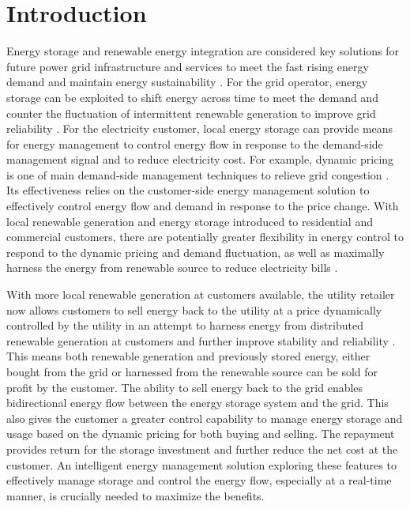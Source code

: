 \documentclass[journal]{IEEEtran}
\begin{document}
\section{Introduction} \label{sec:Introduction}

Energy storage and renewable energy integration are considered key solutions for  future power grid infrastructure and services to meet the fast rising energy demand and maintain energy sustainability \cite{dek10,CastilloGayme:Elsevier14}. For the grid operator, energy storage  can be exploited to shift energy across time to meet the demand and counter the fluctuation of intermittent renewable generation to improve grid reliability \cite{CastilloGayme:Elsevier14,SuGamal:TPS13,SunDongLiang:JSTSP14,SunLiangDongTaylor:TPS16,SunDongLiang:TSG16,ZhangGatsis_TSE13}. For the electricity  customer, local energy storage can provide means  for energy management to  control energy flow in response to the demand-side management signal and to reduce electricity cost. For example, dynamic pricing is one of main demand-side management techniques to relieve grid congestion \cite{Faruquietal:ElectrJ09,Wong&Sen&Ha&Chiang:JSAC2012}. Its effectiveness relies on the customer-side energy management solution to effectively control energy flow and demand in response to the price change. With local  renewable generation and energy storage introduced to residential and commercial customers, there are potentially greater flexibility in energy control  to respond to the dynamic pricing and demand fluctuation, as well as maximally harness the energy from renewable source to reduce electricity bills \cite{Wang&etal:TSG14,He&Zhang_TSG12,Li&Dong:JSAC15,Li&Dong:TSG16,Zhang&Schaar:JTSP14,MoghadamZhangMa:SGCOM14}.


With more local renewable generation at customers available, the utility retailer now allows customers to sell energy back to the utility at a price dynamically controlled by the utility in an attempt to harness energy from distributed renewable generation at customers and further improve stability and reliability \cite{ackermann2001overview}.   This means both renewable generation and previously stored energy, either bought from the grid or harnessed from the renewable source can be sold for profit by the customer. The ability to sell energy back to the grid enables bidirectional  energy flow between the energy storage system and the grid. This also gives the customer  a greater control capability to manage energy storage and usage    based on the dynamic pricing for both buying and selling. The repayment provides return for the  storage investment and further reduce the net cost at the customer. An intelligent energy  management solution exploring these features to    effectively manage storage and control the energy flow,  especially at a real-time manner, is  crucially needed to maximize the benefits.
\end{document}
